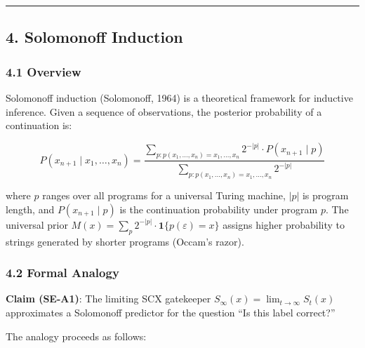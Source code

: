 \documentclass[
  12pt,
]{article}
\begin{document}
\begin{center}\rule{0.5\linewidth}{0.5pt}\end{center}

\subsection{4. Solomonoff Induction}\label{solomonoff-induction}

\subsubsection{4.1 Overview}\label{overview-3}

Solomonoff induction (Solomonoff, 1964) is a theoretical framework for
inductive inference. Given a sequence of observations, the posterior
probability of a continuation is:

\[P(x_{n+1} \mid x_1, \ldots, x_n) = \frac{\sum_{p: p(x_1,\ldots,x_n) = x_1,\ldots,x_n} 2^{-|p|} \cdot P(x_{n+1} \mid p)}{\sum_{p: p(x_1,\ldots,x_n) = x_1,\ldots,x_n} 2^{-|p|}}\]

where \(p\) ranges over all programs for a universal Turing machine,
\(|p|\) is program length, and \(P(x_{n+1} \mid p)\) is the continuation
probability under program \(p\). The universal prior
\(M(x) = \sum_p 2^{-|p|} \cdot \mathbf{1}\{p(\varepsilon) = x\}\)
assigns higher probability to strings generated by shorter programs
(Occam's razor).

\subsubsection{4.2 Formal Analogy}\label{formal-analogy}

\textbf{Claim (SE-A1)}: The limiting SCX gatekeeper
\(S_\infty(x) = \lim_{t\to\infty} S_t(x)\) approximates a Solomonoff
predictor for the question ``Is this label correct?''

The analogy proceeds as follows:
\end{document}
